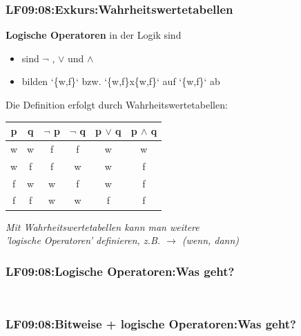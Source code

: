 \begin{frame}[fragile]  
  \frametitle{LF09:08:Exkurs:Wahrheitswertetabellen}
  \vspace{0.2cm}

  \begin{small}
  \textbf{Logische Operatoren} in der Logik sind 
  \begin{itemize}
    \item sind \texttt{$\neg$} , \texttt{$\lor$} und \texttt{$\land$} 
    \item bilden `\{w,f\}` bzw. `\{w,f\}x\{w,f\}` auf `\{w,f\}` ab
  \end{itemize}
    
  \vspace{0.2cm}

Die Definition erfolgt durch Wahrheitswertetabellen:

  \begin{center}

      \renewcommand{\arraystretch}{1.3}
\begin{tabular}{c|c|c|c|c|c|}
p & q & $\neg$ p & $\neg$ q & p $\lor$ q & p $\land$ q \\
\hline
w & w & f & f & w & w \\
w & f & f & w & w & f \\
f & w & w & f & w & f \\
f & f & w & w & f & f 
\end{tabular}
    \end{center}
  \end{small}
  
  \vspace{0.5cm}
\begin{footnotesize}
    \begin{flushright}
      \textit{Mit Wahrheitswertetabellen kann man weitere \\
      'logische Operatoren' definieren, z.B. $\to$ (wenn, dann)}
    \end{flushright}
  \end{footnotesize}

\end{frame}

\begin{frame}[fragile]  
  \frametitle{LF09:08:Logische Operatoren:Was geht?}
  \begin{center}
    \begin{minipage}{0.6\textwidth}
      \inputminted[fontsize=\footnotesize,linenos]{python}{\snpLf/dm-0908-logop.py}
    \end{minipage}
      
    \vspace{1cm}
    \begin{minipage}{0.6\textwidth}
      \inputminted[fontsize=\footnotesize,linenos]{c++}{\snpLf/dm-0908-logop.cc}
    \end{minipage}
  \end{center}
\end{frame}

\begin{frame}[fragile]  
  \frametitle{LF09:08:Bitweise + logische Operatoren:Was geht?}
  \begin{center}
    \begin{minipage}{0.6\textwidth}
      \inputminted[fontsize=\footnotesize,linenos]{python}{\snpLf/dm-0908-log-riddle.py}
    \end{minipage}
  \end{center}
\end{frame}

